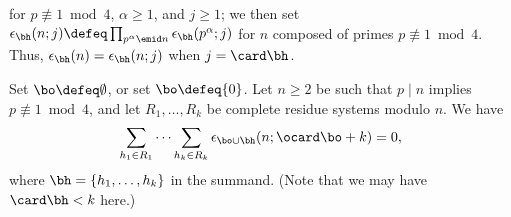 \documentclass[12pt, reqno, twoside, letterpaper]{amsart}
\begin{document}
\noindent 
for $p \not\equiv 1 \bmod 4$, $\alpha \ge 1$, and $j \ge 1$; we 
then set 
$
 \epsilon_{\bh}(n;j) 
  \defeq \prod_{p^{\alpha} \emid n} 
   \epsilon_{\bh}(p^{\alpha};j)
$
for $n$ composed of primes $p \not\equiv 1 \bmod 4$.
%
Thus, $\epsilon_{\bh}(n) = \epsilon_{\bh}(n;j)$ when $j = \card \bh$.

\begin{lemma}
 \label{lem:cancel}
%
Set $\bo \defeq \emptyset$, or set $\bo \defeq \{0\}$.
%
Let $n \ge 2$ be such that $p \mid n$ implies 
$p \not\equiv 1 \bmod 4$, and let $R_1,\ldots,R_k$ be complete 
residue systems modulo $n$.
%
We have 
\[
 \sum_{h_1 \in R_1} 
  \cdots 
   \sum_{h_k \in R_k}
    \epsilon_{\bo \cup \bh}(n; \ocard \bo + k)
      =
       0,
\]
where $\bh = \{h_1,\ldots,h_k\}$ in the summand. 
%
\textup{(}Note that we may have $\card \bh < k$ here.\textup{)}
\end{lemma}
\end{document}
